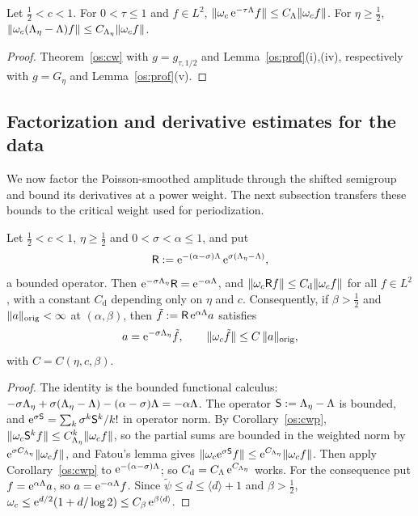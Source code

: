 \begin{corollary}\label{os:cwp}
Let $\tfrac12<c<1$. For $0<\tau\le1$ and $f\in L^2$, $\lVert \omega_c\,\mathrm{e}^{-\tau\Lambda}f\rVert\le C_\Lambda\lVert \omega_c f\rVert$. For $\eta\ge\tfrac12$,
$\lVert \omega_c(\Lambda_\eta-\Lambda)f\rVert\le C_{\Lambda_\eta}\lVert \omega_c f\rVert$.
\end{corollary}
\begin{proof}
Theorem~\ref{os:cw} with $g=g_{\tau,1/2}$ and Lemma~\ref{os:prof}(i),(iv), respectively with $g=G_\eta$ and Lemma~\ref{os:prof}(v).
\end{proof}

\subsection{Factorization and derivative estimates for the data}\label{subsec:pc-data}
We now factor the Poisson-smoothed amplitude through the shifted semigroup and bound its derivatives at a power weight.
The next subsection transfers these bounds to the critical weight used for periodization.

\begin{proposition}\label{os:data}
Let $\tfrac12<c<1$, $\eta\ge\tfrac12$ and $0<\sigma<\alpha\le1$, and put
\[
\mathsf R:=\mathrm{e}^{-(\alpha-\sigma)\Lambda}\,\mathrm{e}^{\sigma(\Lambda_\eta-\Lambda)},
\]
a bounded operator. Then $\mathrm{e}^{-\sigma\Lambda_\eta}\mathsf R=\mathrm{e}^{-\alpha\Lambda}$, and
$\lVert \omega_c\mathsf Rf\rVert\le C_{\mathrm d}\lVert \omega_c f\rVert$ for all $f\in L^2$, with a constant $C_{\mathrm d}$ depending only on $\eta$ and $c$.
Consequently, if $\beta>\tfrac12$ and $\lVert a\rVert_{\mathrm{orig}}<\infty$ at $(\alpha,\beta)$, then $\tilde f:=\mathsf R\,\mathrm{e}^{\alpha\Lambda}a$ satisfies
\[
a=\mathrm{e}^{-\sigma\Lambda_\eta}\tilde f,\qquad\lVert \omega_c\tilde f\rVert\le C\,\lVert a\rVert_{\mathrm{orig}},
\]
with $C=C(\eta,c,\beta)$.
\end{proposition}
\begin{proof}
The identity is the bounded functional calculus: $-\sigma\Lambda_\eta+\sigma(\Lambda_\eta-\Lambda)-(\alpha-\sigma)\Lambda=-\alpha\Lambda$. The operator
$\mathsf S:=\Lambda_\eta-\Lambda$ is bounded, and $\mathrm{e}^{\sigma\mathsf S}=\sum_k\sigma^k\mathsf S^k/k!$ in operator norm. By Corollary~\ref{os:cwp},
$\lVert \omega_c\mathsf S^kf\rVert\le C_{\Lambda_\eta}^k\lVert \omega_c f\rVert$, so the partial sums are bounded in the weighted norm by $\mathrm{e}^{\sigma C_{\Lambda_\eta}}\lVert \omega_c f\rVert$, and
Fatou's lemma gives $\lVert \omega_c\mathrm{e}^{\sigma\mathsf S}f\rVert\le\mathrm{e}^{C_{\Lambda_\eta}}\lVert \omega_c f\rVert$. Then apply Corollary~\ref{os:cwp} to
$\mathrm{e}^{-(\alpha-\sigma)\Lambda}$; so $C_{\mathrm d}=C_\Lambda\,\mathrm{e}^{C_{\Lambda_\eta}}$ works. For the consequence put $f=\mathrm{e}^{\alpha\Lambda}a$, so $a=\mathrm{e}^{-\alpha\Lambda}f$. Since $\tilde\psi\le d\le\langle d\rangle+1$ and
$\beta>\tfrac12$, $\omega_c\le\mathrm{e}^{d/2}(1+d/\log2)\le C_\beta\,\mathrm{e}^{\beta\langle d\rangle}$.
\end{proof}

